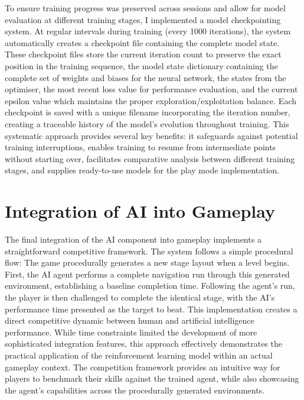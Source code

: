To ensure training progress was preserved across sessions and allow for model evaluation at different training stages, I implemented a model checkpointing system. 
At regular intervals during training (every 1000 iterations), the system automatically creates a checkpoint file containing the complete model state. 
These checkpoint files store the current iteration count to preserve the exact position in the training sequence, the model state dictionary containing the complete set of weights and biases for the neural network, the states from the optimiser, the most recent loss value for performance evaluation, and the current epsilon value which maintains the proper exploration/exploitation balance. 
Each checkpoint is saved with a unique filename incorporating the iteration number, creating a traceable history of the model's evolution throughout training. This systematic approach provides several key benefits: it safeguards against potential training interruptions, enables training to resume from intermediate points without starting over, facilitates comparative analysis between different training stages, and supplies ready-to-use models for the play mode implementation.


\section{Integration of AI into Gameplay}

The final integration of the AI component into gameplay implements a straightforward competitive framework. The system follows a simple procedural flow:
The game procedurally generates a new stage layout when a level begins. 
First, the AI agent performs a complete navigation run through this generated environment, establishing a baseline completion time. 
Following the agent's run, the player is then challenged to complete the identical stage, with the AI's performance time presented as the target to beat. 
This implementation creates a direct competitive dynamic between human and artificial intelligence performance. 
While time constraints limited the development of more sophisticated integration features, this approach effectively demonstrates the practical application of the reinforcement learning model within an actual gameplay context.
The competition framework provides an intuitive way for players to benchmark their skills against the trained agent, while also showcasing the agent's capabilities across the procedurally generated environments.
